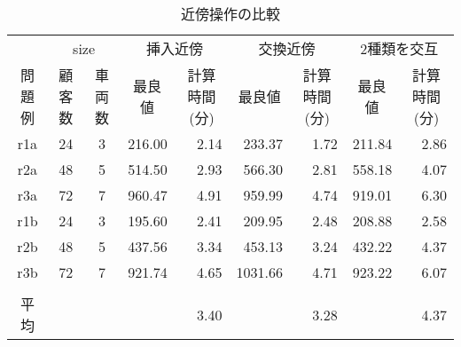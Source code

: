 \begin{table}[]
  \renewcommand{\arraystretch}{0.8}
  \caption{近傍操作の比較}
  \label{insert}
\begin{tabular}{cccrrrrrr}
\hline
\multicolumn{1}{l}{} & \multicolumn{2}{c}{size} & \multicolumn{2}{c}{挿入近傍}                              & \multicolumn{2}{c}{交換近傍}                              & \multicolumn{2}{c}{2種類を交互}                            \\ \cline{2-9}
問題例                  & 顧客数         & 車両数        & \multicolumn{1}{c}{最良値} & \multicolumn{1}{c}{計算時間(分)} & \multicolumn{1}{c}{最良値} & \multicolumn{1}{c}{計算時間(分)} & \multicolumn{1}{c}{最良値} & \multicolumn{1}{c}{計算時間(分)} \\ \cline{2-9}
r1a                  & 24          & 3          & 216.00                  & 2.14                        & 233.37                  & 1.72                        & 211.84                  & 2.86                        \\
r2a                  & 48          & 5          & 514.50                  & 2.93                        & 566.30                  & 2.81                        & 558.18                  & 4.07                        \\
r3a                  & 72          & 7          & 960.47                  & 4.91                        & 959.99                  & 4.74                        & 919.01                  & 6.30                        \\
r1b                  & 24          & 3          & 195.60                  & 2.41                        & 209.95                  & 2.48                        & 208.88                  & 2.58                        \\
r2b                  & 48          & 5          & 437.56                  & 3.34                        & 453.13                  & 3.24                        & 432.22                & 4.37                        \\
r3b                  & 72          & 7          & 921.74                  & 4.65                        & 1031.66                 & 4.71                        & 923.22                & 6.07                        \\
\multicolumn{1}{l}{} & \multicolumn{1}{l}{} & \multicolumn{1}{l}{} & \multicolumn{1}{l}{}    & \multicolumn{1}{l}{}        & \multicolumn{1}{l}{}    & \multicolumn{1}{l}{}        & \multicolumn{1}{l}{}    & \multicolumn{1}{l}{}        \\
平均                   & \multicolumn{1}{l}{} & \multicolumn{1}{l}{} & \multicolumn{1}{l}{}    & 3.40                        &                         & 3.28                        &                         & 4.37                        \\ \hline
\end{tabular}
\end{table}




